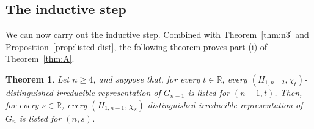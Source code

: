 \documentclass[11pt]{amsart}
\numberwithin{equation}{section}
\theoremstyle{plain}
\newtheorem{theorem}{Theorem}[section]
\theoremstyle{definition}
\theoremstyle{remark}
\newcommand{\R}{\mathbb{R}}
\begin{document}
\subsection{The inductive step}\label{ss:inductive-step}

We can now carry out the inductive step. Combined with Theorem~\ref{thm:n3} and Proposition~\ref{prop:listed-dist}, the following theorem proves part (i) of Theorem~\ref{thm:A}.

\begin{theorem}\label{thm:inductive-step}
	Let $n\ge4$, and suppose that, for every $t\in\R$, every $(H_{1,n-2},\chi_t)$-distinguished irreducible representation of $G_{n-1}$ is listed for $(n-1,t)$. Then, for every $s\in\R$, every $(H_{1,n-1},\chi_s)$-distinguished irreducible representation of $G_n$ is listed for $(n,s)$.
\end{theorem}
\end{document}
